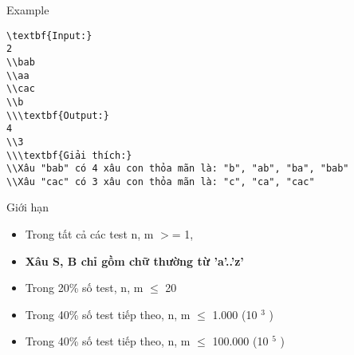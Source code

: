 Example
\begin{verbatim}
\textbf{Input:}
2
\\bab
\\aa
\\cac
\\b
\\\textbf{Output:}
4
\\3
\\\textbf{Giải thích:}
\\Xâu "bab" có 4 xâu con thỏa mãn là: "b", "ab", "ba", "bab"
\\Xâu "cac" có 3 xâu con thỏa mãn là: "c", "ca", "cac" \end{verbatim}
Giới hạn
\begin{itemize}
	\item     Trong tất cả các test n, m $>$= 1,   
	\item \textbf{     Xâu S, B chỉ gồm chữ thường từ 'a'..'z'    }
	\item     Trong 20\% số test, n, m  $\le$  20   
	\item     Trong 40\% số test tiếp theo, n, m  $\le$  1.000 (10    $^     3    $    )   
	\item     Trong 40\% số test tiếp theo, n, m  $\le$  100.000 (10    $^     5    $    )   
\end{itemize}